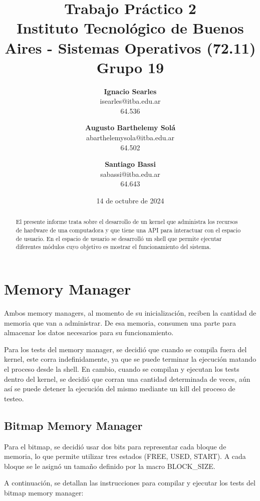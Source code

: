 \documentclass{article}
\title{\textbf{Trabajo Práctico 2} \\ [1ex]
\large Instituto Tecnológico de Buenos Aires - Sistemas Operativos (72.11) \\ [1ex]
\large Grupo 19 }
\date{14 de octubre de 2024}
\author{
\textbf{Ignacio Searles}\\
isearles@itba.edu.ar\\
64.536
\and
\textbf{Augusto Barthelemy Solá}\\
abarthelemysola@itba.edu.ar\\
64.502
\and
\textbf{Santiago Bassi}\\
sabassi@itba.edu.ar\\
64.643
}
\begin{document}
\maketitle

\begin {abstract}

El presente informe trata sobre el desarrollo de un kernel que administra los recursos de hardware de una computadora y que tiene una API para interactuar con el espacio de usuario. En el espacio de usuario se desarrolló un shell que permite ejecutar diferentes módulos cuyo objetivo es mostrar el funcionamiento del sistema.

\end {abstract}

\section {Memory Manager}

Ambos memory managers, al momento de su inicialización, reciben la cantidad de memoria que van a administrar. De esa memoria, consumen una parte para almacenar los datos necesarios para su funcionamiento.

Para los tests del memory manager, se decidió que cuando se compila fuera del kernel, este corra indefinidamente, ya que se puede terminar la ejecución matando el proceso desde la shell. En cambio, cuando se compilan y ejecutan los tests dentro del kernel, se decidió que corran una cantidad determinada de veces, aún así se puede detener la ejecución del mismo mediante un kill del proceso de testeo.

\subsection {Bitmap Memory Manager}

Para el bitmap, se decidió usar dos bits para representar cada bloque de memoria, lo que permite utilizar tres estados (FREE, USED, START). A cada bloque se le asignó un tamaño definido por la macro BLOCK\_SIZE.

A continuación, se detallan las instrucciones para compilar y ejecutar los tests del bitmap memory manager:
\end{document}

